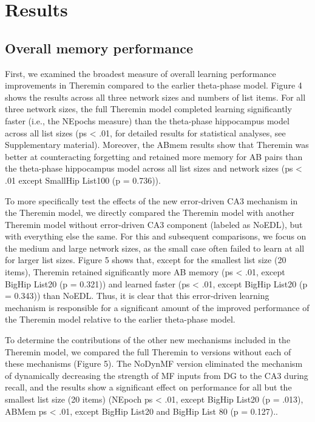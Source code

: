 \documentclass[11pt,twoside]{article}
\newif\myifpdf
\begin{document}
\section{Results}

\subsection{Overall memory performance}

First, we examined the broadest measure of overall learning performance improvements in Theremin compared to the earlier theta-phase model.  Figure 4 shows the results across all three network sizes and numbers of list items.  For all three network sizes, the full Theremin model completed learning significantly faster (i.e., the NEpochs measure) than the theta-phase hippocampus model across all list sizes (ps < .01, for detailed results for statistical analyses, see Supplementary material). Moreover, the ABmem results show that Theremin was better at counteracting forgetting and retained more memory for AB pairs than the theta-phase hippocampus model across all list sizes and network sizes (ps < .01 except SmallHip List100 (p = 0.736)).

To more specifically test the effects of the new error-driven CA3 mechanism in the Theremin model, we directly compared the Theremin model with another Theremin model without error-driven CA3 component (labeled as NoEDL), but with everything else the same. For this and subsequent comparisons, we focus on the medium and large network sizes, as the small case often failed to learn at all for larger list sizes.  Figure 5 shows that, except for the smallest list size (20 items), Theremin retained significantly more AB memory (ps < .01, except BigHip List20 (p = 0.321)) and learned faster (ps < .01, except BigHip List20 (p = 0.343)) than NoEDL.  Thus, it is clear that this error-driven learning mechanism is responsible for a significant amount of the improved performance of the Theremin model relative to the earlier theta-phase model.

To determine the contributions of the other new mechanisms included in the Theremin model, we compared the full Theremin to versions without each of these mechanisms (Figure 5).  The NoDynMF version eliminated the mechanism of dynamically decreasing the strength of MF inputs from DG to the CA3 during recall, and the results show a significant effect on performance for all but the smallest list size (20 items) (NEpoch ps < .01, except BigHip List20 (p = .013), ABMem ps < .01, except BigHip List20 and BigHip List 80 (p = 0.127).. 
\end{document}
